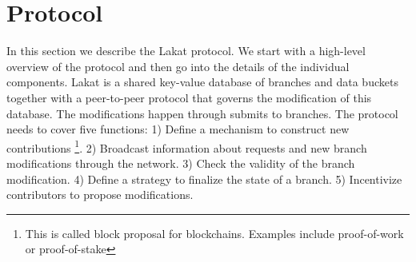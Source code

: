 \documentclass[14pt]{article}
\begin{document}



\section{Protocol}
\label{sc:protocol}

In this section we describe the Lakat protocol. We start with a high-level overview of the protocol and then go into the details of the individual components. Lakat is a shared key-value database of branches and data buckets together with a peer-to-peer protocol that governs the modification of this database. The modifications happen through submits to branches. The protocol needs to cover five functions: 1) Define a mechanism to construct new contributions \footnote{This is called block proposal for blockchains. Examples include proof-of-work or proof-of-stake}. 2) Broadcast information about requests and new branch modifications through the network. 3) Check the validity of the branch modification. 4) Define a strategy to finalize the state of a branch. 5) Incentivize contributors to propose modifications. 
\end{document}
